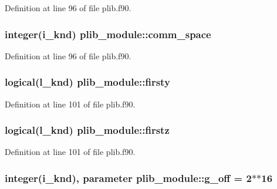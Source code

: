 Definition at line 96 of file plib.\-f90.

\hypertarget{classplib__module_aa5bc6028743a524c4466548e276cb839}{
\subsubsection[{comm\-\_\-space}]{\setlength{\rightskip}{0pt plus 5cm}integer(i\-\_\-knd) plib\-\_\-module\-::comm\-\_\-space}}\label{classplib__module_aa5bc6028743a524c4466548e276cb839}


Definition at line 96 of file plib.\-f90.

\hypertarget{classplib__module_acacb5f9f63dcc742ef176b99534fe626}{
\subsubsection[{firsty}]{\setlength{\rightskip}{0pt plus 5cm}logical(l\-\_\-knd) plib\-\_\-module\-::firsty}}\label{classplib__module_acacb5f9f63dcc742ef176b99534fe626}


Definition at line 101 of file plib.\-f90.

\hypertarget{classplib__module_a2d791ed6cdd38a29604dcb99a7a556fe}{
\subsubsection[{firstz}]{\setlength{\rightskip}{0pt plus 5cm}logical(l\-\_\-knd) plib\-\_\-module\-::firstz}}\label{classplib__module_a2d791ed6cdd38a29604dcb99a7a556fe}


Definition at line 101 of file plib.\-f90.

\hypertarget{classplib__module_aa3f6bda8ab61c2acbdaf18afe105dbae}{
\subsubsection[{g\-\_\-off}]{\setlength{\rightskip}{0pt plus 5cm}integer(i\-\_\-knd), parameter plib\-\_\-module\-::g\-\_\-off = 2$\ast$$\ast$16}}\label{classplib__module_aa3f6bda8ab61c2acbdaf18afe105dbae}


